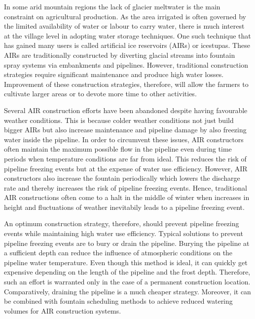 \documentclass[tc, manuscript]{copernicus}
\begin{document}
\introduction

In some arid mountain regions the lack of glacier meltwater is the main constraint on agricultural production.
As the area irrigated is often governed by the limited availability of water or labour to carry water, there is
much interest at the village level in adopting water storage techniques. One such technique that has gained many
users is called artificial ice reservoirs (AIRs) or icestupas. These AIRs are traditionally constructed by
diverting glacial streams into fountain spray systems via embankments and pipelines. However, traditional
construction strategies require significant maintenance and produce high water losses. Improvement of these
construction strategies, therefore, will allow the farmers to cultivate larger areas or to devote more time to
other activities. 

Several AIR construction efforts have been abandoned despite having favourable weather conditions. This is
because colder weather conditions  not just build bigger AIRs but also increase maintenance and pipeline damage
by also freezing water inside the pipeline. In order to circumvent these issues, AIR constructors often maintain
the maximum possible flow in the pipeline even during time periods when temperature conditions are far from
ideal. This reduces the risk of pipeline freezing events but at the expense of water use efficiency. However,
AIR constructors also increase the fountain periodically which lowers the discharge rate and thereby increases
the risk of pipeline freezing events. Hence, traditional AIR constructions often come to a halt in the middle of
winter when increases in height and fluctuations of weather inevitabily leads to a pipeline freezing event.

An optimum construction strategy, therefore, should prevent pipeline freezing events while maintaining high
water use efficiency. Typical solutions to prevent pipeline freezing events are to bury or drain the pipeline.
Burying the pipeline at a sufficient depth can reduce the influence of atmospheric conditions on the pipeline
water temperature. Even though this method is ideal, it can quickly get expensive depending on the length of the
pipeline and the frost depth. Therefore, such an effort is warranted only in the case of a permanent
construction location. Comparatively, draining the pipeline is a much cheaper strategy. Moreover, it can be
combined with fountain scheduling methods to achieve reduced watering volumes for AIR construction systems.
\end{document}
